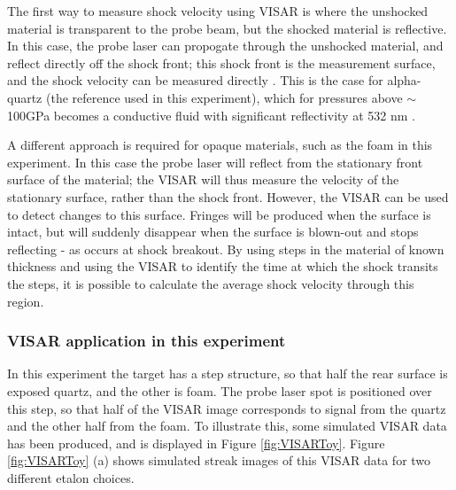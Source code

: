 The first way to measure shock velocity using VISAR is where the unshocked material is transparent to the probe beam, but the shocked material is reflective. In this case, the probe laser can propogate through the unshocked material, and reflect directly off the shock front; this shock front is the measurement surface, and the shock velocity can be measured directly \cite{Celliers2004}. This is the case for alpha-quartz (the reference used in this experiment), which for pressures above $\sim$ 100GPa becomes a conductive fluid with significant reflectivity at 532 \unit{\nano\meter} \cite{Hicks2006a}.

A different approach is required for opaque materials, such as the foam in this experiment. In this case the probe laser will reflect from the stationary front surface of the material; the VISAR will thus measure the velocity of the stationary surface, rather than the shock front. However, the VISAR can be used to detect changes to this surface. Fringes will be produced when the surface is intact, but will suddenly disappear when the surface is blown-out and stops reflecting - as occurs at shock breakout. By using steps in the material of known thickness and using the VISAR to identify the time at which the shock transits the steps, it is possible to calculate the average shock velocity through this region.

\subsubsection{VISAR application in this experiment}

In this experiment the target has a step structure, so that half the rear surface is exposed quartz, and the other is foam. The probe laser spot is positioned over this step, so that half of the VISAR image corresponds to signal from the quartz and the other half from the foam. To illustrate this, some simulated VISAR data has been produced, and is displayed in Figure \ref{fig:VISARToy}. Figure \ref{fig:VISARToy} (a) shows simulated streak images of this VISAR data for two different etalon choices.

